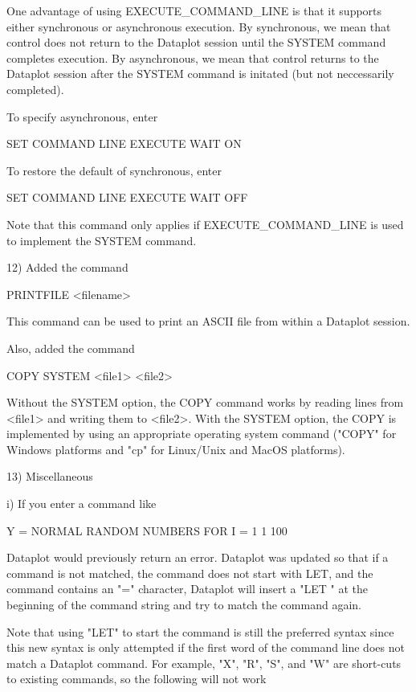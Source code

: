          One advantage of using EXECUTE_COMMAND_LINE is that it supports
         either synchronous or asynchronous execution.  By synchronous, we
         mean that control does not return to the Dataplot session until
         the SYSTEM command completes execution.  By asynchronous, we
         mean that control returns to the Dataplot session after the
         SYSTEM command is initated (but not neccessarily completed).

         To specify asynchronous, enter

             SET COMMAND LINE EXECUTE WAIT ON

         To restore the default of synchronous, enter

             SET COMMAND LINE EXECUTE WAIT OFF

         Note that this command only applies if EXECUTE_COMMAND_LINE is
         used to implement the SYSTEM command.

12) Added the command

      PRINTFILE <filename>

    This command can be used to print an ASCII file from within a
    Dataplot session.

    Also, added the command

       COPY SYSTEM <file1> <file2>

    Without the SYSTEM option, the COPY command works by reading lines
    from <file1> and writing them to <file2>.  With the SYSTEM option,
    the COPY is implemented by using an appropriate operating system
    command ("COPY" for Windows platforms and "cp" for Linux/Unix and
    MacOS platforms).

13) Miscellaneous

      i) If you enter a command like

            Y = NORMAL RANDOM NUMBERS FOR I = 1 1 100

         Dataplot would previously return an error.  Dataplot was
         updated so that if a command is not matched, the command
         does not start with LET, and the command contains an
         "=" character, Dataplot will insert a "LET " at the
         beginning of the command string and try to match the command
         again.

         Note that using "LET" to start the command is still the
         preferred syntax since this new syntax is only attempted if
         the first word of the command line does not match a
         Dataplot command.  For example, "X", "R", "S", and "W"
         are short-cuts to existing commands, so the following
         will not work


